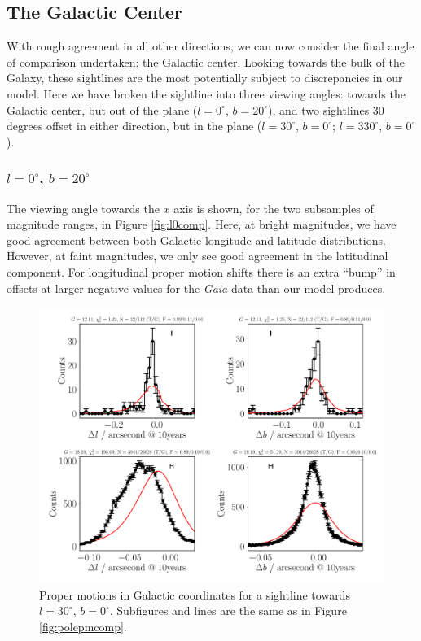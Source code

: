 \documentclass[fleqn,usenatbib]{mnras}
\begin{document}
\subsection{The Galactic Center}
With rough agreement in all other directions, we can now consider the final angle of comparison undertaken: the Galactic center. Looking towards the bulk of the Galaxy, these sightlines are the most potentially subject to discrepancies in our model. Here we have broken the sightline into three viewing angles: towards the Galactic center, but out of the plane ($l = 0^\circ$, $b = 20^\circ$), and two sightlines 30 degrees offset in either direction, but in the plane ($l = 30^\circ$, $b = 0^\circ$; $l = 330^\circ$, $b = 0^\circ$).

\subsubsection{$l = 0^\circ$, $b = 20^\circ$}
The viewing angle towards the $x$ axis is shown, for the two subsamples of magnitude ranges, in Figure \ref{fig:l0comp}. Here, at bright magnitudes, we have good agreement between both Galactic longitude and latitude distributions. However, at faint magnitudes, we only see good agreement in the latitudinal component. For longitudinal proper motion shifts there is an extra ``bump'' in offsets at larger negative values for the \textit{Gaia} data than our model produces.

\begin{figure}
    \centering
    \includegraphics[width=\columnwidth]{Plots/plots_pm_gaia_30_0.pdf}
    \caption{Proper motions in Galactic coordinates for a sightline towards $l = 30^\circ$, $b = 0^\circ$. Subfigures and lines are the same as in Figure \ref{fig:polepmcomp}.}
    \label{fig:l30comp}
\end{figure}
\end{document}
